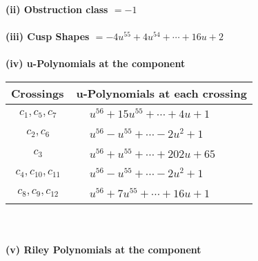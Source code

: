 \documentclass[1p]{elsarticle_modified}
\theoremstyle{definition}
\begin{document}
\flushleft \textbf{(ii) Obstruction class $= -1$}\\~\\
\flushleft \textbf{(iii) Cusp Shapes $= -4 u^{55}+4 u^{54}+\cdots+16 u+2$}\\~\\
\newpage\renewcommand{\arraystretch}{1}
\flushleft \textbf{(iv) u-Polynomials at the component}\newline \\
\begin{tabular}{m{50pt}|m{274pt}}
Crossings & \hspace{64pt}u-Polynomials at each crossing \\
\hline $$\begin{aligned}c_{1},c_{5},c_{7}\end{aligned}$$&$\begin{aligned}
&u^{56}+15 u^{55}+\cdots+4 u+1
\end{aligned}$\\
\hline $$\begin{aligned}c_{2},c_{6}\end{aligned}$$&$\begin{aligned}
&u^{56}- u^{55}+\cdots-2 u^2+1
\end{aligned}$\\
\hline $$\begin{aligned}c_{3}\end{aligned}$$&$\begin{aligned}
&u^{56}+u^{55}+\cdots+202 u+65
\end{aligned}$\\
\hline $$\begin{aligned}c_{4},c_{10},c_{11}\end{aligned}$$&$\begin{aligned}
&u^{56}- u^{55}+\cdots-2 u^2+1
\end{aligned}$\\
\hline $$\begin{aligned}c_{8},c_{9},c_{12}\end{aligned}$$&$\begin{aligned}
&u^{56}+7 u^{55}+\cdots+16 u+1
\end{aligned}$\\
\hline
\end{tabular}\\~\\
\newpage\renewcommand{\arraystretch}{1}
\flushleft \textbf{(v) Riley Polynomials at the component}\newline \\
\end{document}
